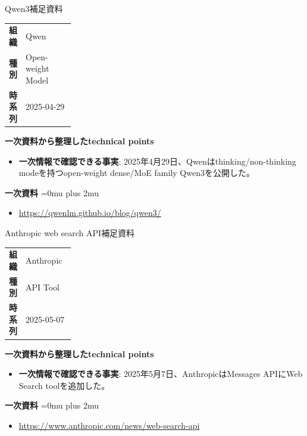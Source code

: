\begin{technicalnote}{Qwen3}{補足資料}
\begingroup
\begin{tabularx}{\linewidth}{@{}>{\bfseries}p{0.22\linewidth}X@{}}
組織 & Qwen \\
種別 & Open-weight Model \\
時系列 & 2025-04-29 \\
\end{tabularx}
\smallskip
\begin{minipage}{\linewidth}
{\bfseries 一次資料から整理したtechnical points}
\begin{itemize}[leftmargin=1.5em,itemsep=0.35em]
\item \textbf{一次情報で確認できる事実}: 2025年4月29日、Qwenはthinking/non-thinking modeを持つopen-weight dense/MoE family Qwen3を公開した。
\end{itemize}
\begin{samepage}
{\bfseries 一次資料}
\begingroup\sloppy
\Urlmuskip=0mu plus 2mu\relax
\begin{itemize}[leftmargin=1.5em,itemsep=0.25em]
\item {\scriptsize\url{https://qwenlm.github.io/blog/qwen3/}}
\end{itemize}
\endgroup
\end{samepage}
\end{minipage}
\endgroup
\end{technicalnote}
\medskip

\begin{technicalnote}{Anthropic web search API}{補足資料}
\begingroup
\begin{tabularx}{\linewidth}{@{}>{\bfseries}p{0.22\linewidth}X@{}}
組織 & Anthropic \\
種別 & API Tool \\
時系列 & 2025-05-07 \\
\end{tabularx}
\smallskip
\begin{minipage}{\linewidth}
{\bfseries 一次資料から整理したtechnical points}
\begin{itemize}[leftmargin=1.5em,itemsep=0.35em]
\item \textbf{一次情報で確認できる事実}: 2025年5月7日、AnthropicはMessages APIにWeb Search toolを追加した。
\end{itemize}
\begin{samepage}
{\bfseries 一次資料}
\begingroup\sloppy
\Urlmuskip=0mu plus 2mu\relax
\begin{itemize}[leftmargin=1.5em,itemsep=0.25em]
\item {\scriptsize\url{https://www.anthropic.com/news/web-search-api}}
\end{itemize}
\endgroup
\end{samepage}
\end{minipage}
\endgroup
\end{technicalnote}
\medskip

